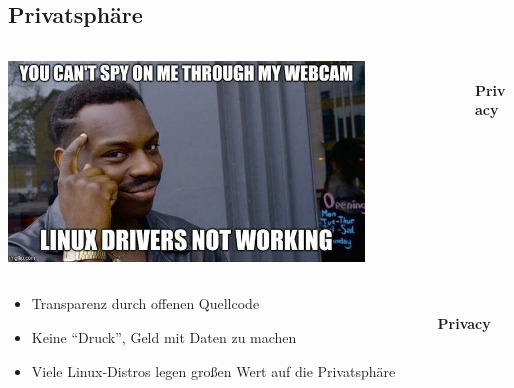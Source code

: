 \documentclass[
    ngerman,
    accentcolor=3b,
    fontsize= 12pt,
    a4paper,
    aspectratio=169,
    colorback=true,
    fancy_row_colors,
    leqno,
    fleqn,
    boxarc=3pt,
    fleqn,
    main,
    design=2008,
]{algoslides}
\begin{document}
    \subsection{Privatsphäre}
    \begin{frame}[c]
        \slidehead{}
        \begin{columns}
            \begin{column}[c]{0.75\textwidth}
                \centering\includegraphics[width=0.8\textwidth]{linux_privacy.jpg}
            \end{column}
            \begin{column}[c]{0.25\textwidth}
                \begin{center}
                    \fontsize{50pt}{0pt}\selectfont\faUserSecret{}\\[0.2cm]
                    \normalsize\textbf{Privacy}
                \end{center}
            \end{column}
        \end{columns}
    \end{frame}
    \begin{frame}[c]
        \slidehead{}
        \begin{columns}
            \begin{column}[c]{0.75\textwidth}
                \begin{itemize}
                    \item Transparenz durch offenen Quellcode
                    \item Keine \enquote{Druck}, Geld mit Daten zu machen
                    \item Viele Linux-Distros legen großen Wert auf die Privatsphäre
                \end{itemize}
            \end{column}
            \begin{column}[c]{0.25\textwidth}
                \begin{center}
                    \fontsize{50pt}{0pt}\selectfont\faUserSecret{}\\[0.2cm]
                    \normalsize\textbf{Privacy}
                \end{center}
            \end{column}
        \end{columns}
    \end{frame}
\end{document}

